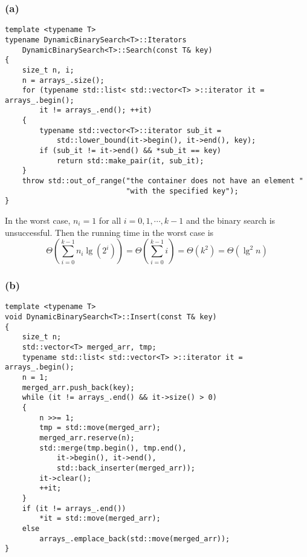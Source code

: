 \subsubsection*{(a)}

\begin{verbatim}
template <typename T>
typename DynamicBinarySearch<T>::Iterators 
    DynamicBinarySearch<T>::Search(const T& key)
{
    size_t n, i;
    n = arrays_.size();
    for (typename std::list< std::vector<T> >::iterator it = arrays_.begin(); 
        it != arrays_.end(); ++it)
    {
        typename std::vector<T>::iterator sub_it = 
            std::lower_bound(it->begin(), it->end(), key);
        if (sub_it != it->end() && *sub_it == key)
            return std::make_pair(it, sub_it);
    }
    throw std::out_of_range("the container does not have an element "
                            "with the specified key");
}
\end{verbatim}

In the worst case, $n_i = 1$ for all $i = 0, 1, \cdots, k - 1$
and the binary search is unsuccessful.
Then the running time in the worst case is 
\begin{equation*}
    \Theta(\sum\limits_{i = 0}^{k - 1} n_i \lg(2^i))
    = \Theta(\sum\limits_{i = 0}^{k - 1} i)
    = \Theta(k^2)
    = \Theta(\lg^2 n)
\end{equation*}

\subsubsection*{(b)}

\begin{verbatim}
template <typename T>
void DynamicBinarySearch<T>::Insert(const T& key)
{
    size_t n;
    std::vector<T> merged_arr, tmp;
    typename std::list< std::vector<T> >::iterator it = arrays_.begin();
    n = 1;
    merged_arr.push_back(key);
    while (it != arrays_.end() && it->size() > 0)
    {
        n >>= 1;
        tmp = std::move(merged_arr);
        merged_arr.reserve(n);
        std::merge(tmp.begin(), tmp.end(), 
            it->begin(), it->end(), 
            std::back_inserter(merged_arr));
        it->clear();
        ++it;
    }
    if (it != arrays_.end())
        *it = std::move(merged_arr);
    else
        arrays_.emplace_back(std::move(merged_arr));
}
\end{verbatim}

